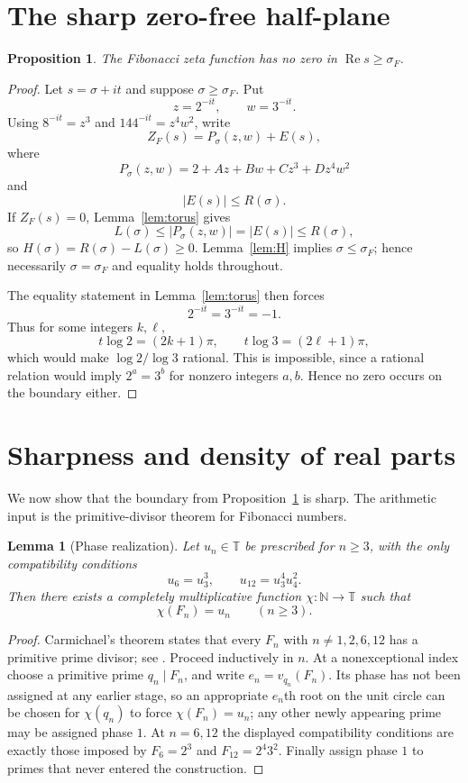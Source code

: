 \documentclass[11pt]{article}
\newtheorem{lemma}[theorem]{Lemma}
\newtheorem{proposition}[theorem]{Proposition}
\theoremstyle{remark}
\newcommand{\T}{\mathbb T}
\newcommand{\ZF}{Z_F}
\newcommand{\Ree}{\operatorname{Re}}
\begin{document}
\section{The sharp zero-free half-plane}

\begin{proposition}\label{prop:zerofree}
The Fibonacci zeta function has no zero in $\Ree s\ge\sigma_F$.
\end{proposition}

\begin{proof}
Let $s=\sigma+it$ and suppose $\sigma\ge\sigma_F$.  Put
\[
z=2^{-it},\qquad w=3^{-it}.
\]
Using $8^{-it}=z^3$ and $144^{-it}=z^4w^2$, write
\[
\ZF(s)=P_\sigma(z,w)+E(s),
\]
where
\[
P_\sigma(z,w)=2+Az+Bw+Cz^3+Dz^4w^2
\]
and
\[
|E(s)|\le R(\sigma).
\]
If $\ZF(s)=0$, Lemma~\ref{lem:torus} gives
\[
L(\sigma)\le |P_\sigma(z,w)|=|E(s)|\le R(\sigma),
\]
so $H(\sigma)=R(\sigma)-L(\sigma)\ge0$.  Lemma~\ref{lem:H} implies $\sigma\le\sigma_F$; hence necessarily $\sigma=\sigma_F$ and equality holds throughout.

The equality statement in Lemma~\ref{lem:torus} then forces
\[
2^{-it}=3^{-it}=-1.
\]
Thus for some integers $k,\ell$,
\[
t\log2=(2k+1)\pi,
\qquad
t\log3=(2\ell+1)\pi,
\]
which would make $\log2/\log3$ rational.  This is impossible, since a rational relation would imply $2^a=3^b$ for nonzero integers $a,b$.  Hence no zero occurs on the boundary either.
\end{proof}

\section{Sharpness and density of real parts}

We now show that the boundary from Proposition~\ref{prop:zerofree} is sharp.  The arithmetic input is the primitive-divisor theorem for Fibonacci numbers.

\begin{lemma}[Phase realization]\label{lem:phase}
Let $u_n\in\T$ be prescribed for $n\ge3$, with the only compatibility conditions
\[
u_6=u_3^3,
\qquad
u_{12}=u_3^4u_4^2.
\]
Then there exists a completely multiplicative function $\chi:\mathbb N\to\T$ such that
\[
\chi(F_n)=u_n\qquad(n\ge3).
\]
\end{lemma}

\begin{proof}
Carmichael's theorem states that every $F_n$ with $n\neq1,2,6,12$ has a primitive prime divisor; see \cite{Yabuta2001}.  Proceed inductively in $n$.  At a nonexceptional index choose a primitive prime $q_n\mid F_n$, and write $e_n=v_{q_n}(F_n)$.  Its phase has not been assigned at any earlier stage, so an appropriate $e_n$th root on the unit circle can be chosen for $\chi(q_n)$ to force $\chi(F_n)=u_n$; any other newly appearing prime may be assigned phase $1$.  At $n=6,12$ the displayed compatibility conditions are exactly those imposed by $F_6=2^3$ and $F_{12}=2^4 3^2$.  Finally assign phase $1$ to primes that never entered the construction.
\end{proof}
\end{document}
